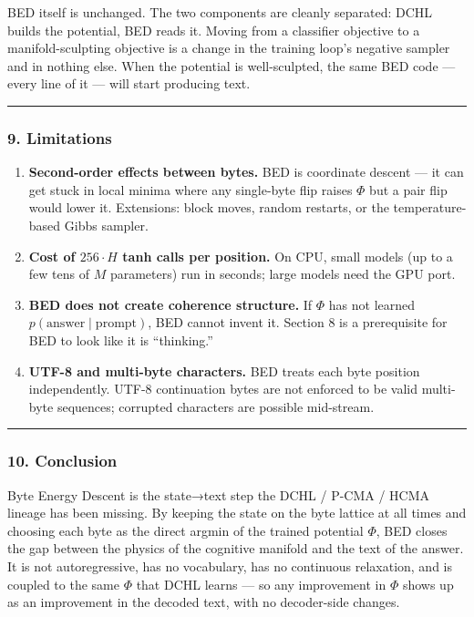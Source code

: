 \documentclass[
  11pt,
  a4paper,
]{article}
\providecommand{\tightlist}{%
  \setlength{\itemsep}{0pt}\setlength{\parskip}{0pt}}
\begin{document}
BED itself is unchanged. The two components are cleanly separated: DCHL
builds the potential, BED reads it. Moving from a classifier objective
to a manifold-sculpting objective is a change in the training loop's
negative sampler and in nothing else. When the potential is
well-sculpted, the same BED code --- every line of it --- will start
producing text.

\begin{center}\rule{0.5\linewidth}{0.5pt}\end{center}

\subsubsection{9. Limitations}\label{limitations-1}

\begin{enumerate}
\def\labelenumi{\arabic{enumi}.}
\tightlist
\item
  \textbf{Second-order effects between bytes.} BED is coordinate descent
  --- it can get stuck in local minima where any single-byte flip raises
  \(\Phi\) but a pair flip would lower it. Extensions: block moves,
  random restarts, or the temperature-based Gibbs sampler.
\item
  \textbf{Cost of \(256 \cdot H\) tanh calls per position.} On CPU,
  small models (up to a few tens of \(M\) parameters) run in seconds;
  large models need the GPU port.
\item
  \textbf{BED does not create coherence structure.} If \(\Phi\) has not
  learned \(p(\text{answer} \mid \text{prompt})\), BED cannot invent it.
  Section 8 is a prerequisite for BED to look like it is ``thinking.''
\item
  \textbf{UTF-8 and multi-byte characters.} BED treats each byte
  position independently. UTF-8 continuation bytes are not enforced to
  be valid multi-byte sequences; corrupted characters are possible
  mid-stream.
\end{enumerate}

\begin{center}\rule{0.5\linewidth}{0.5pt}\end{center}

\subsubsection{10. Conclusion}\label{conclusion-1}

Byte Energy Descent is the state→text step the DCHL / P-CMA / HCMA
lineage has been missing. By keeping the state on the byte lattice at
all times and choosing each byte as the direct argmin of the trained
potential \(\Phi\), BED closes the gap between the physics of the
cognitive manifold and the text of the answer. It is not autoregressive,
has no vocabulary, has no continuous relaxation, and is coupled to the
same \(\Phi\) that DCHL learns --- so any improvement in \(\Phi\) shows
up as an improvement in the decoded text, with no decoder-side changes.
\end{document}
